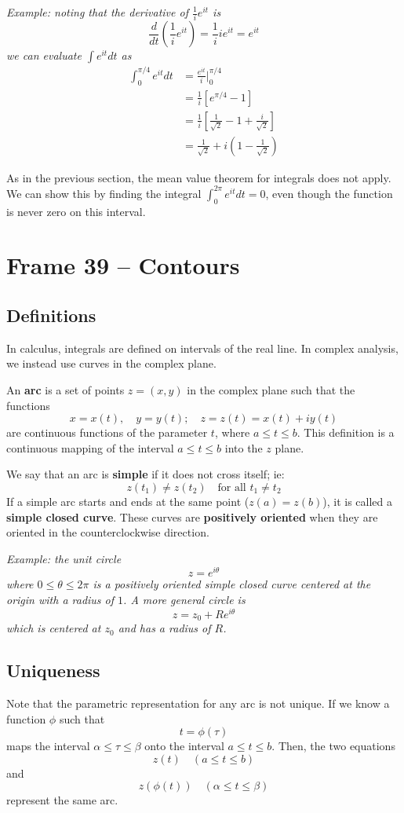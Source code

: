 \documentclass{article}
\renewcommand{\emph}{\textbf}
\begin{document}
\textit{Example: noting that the derivative of $\frac{1}{i} e^{it}$ is
\[
	\frac{d}{dt} \left( \frac{1}{i} e^{it} \right)
	= \frac{1}{i} ie^{it}
	= e^{it}
\]
we can evaluate $\int e^{it} dt$ as
\begin{align*}
	\int_0^{\pi/4} e^{it} dt 
	&= \frac{e^{it}}{i} \Big|_0^{\pi/4} \\
	&= \frac{1}{i} \left[ e^{\pi/4} - 1 \right] \\
	&= \frac{1}{i} \left[ \frac{1}{\sqrt{2}} - 1 + \frac{i}{\sqrt{2}} \right] \\
	&= \frac{1}{\sqrt{2}} + i\left( 1 - \frac{1}{\sqrt{2}} \right)
\end{align*}}

As in the previous section, the mean value theorem for integrals does not apply. We can show this by finding the integral $\int_0^{2\pi} e^{it} dt = 0$, even though the function is never zero on this interval.


\clearpage
\section{Frame 39 -- Contours}
\subsection{Definitions}
In calculus, integrals are defined on intervals of the real line. In complex analysis, we instead use curves in the complex plane.

An \emph{arc} is a set of points $z = (x, y)$ in the complex plane such that the functions
\[
	x = x(t),	\quad y = y(t);	\quad z = z(t) = x(t) + iy(t)
\]
are continuous functions of the parameter $t$, where $a \le t \le b$. This definition is a continuous mapping of the interval $a \le t \le b$ into the $z$ plane.

We say that an arc is \emph{simple} if it does not cross itself; ie:
\[
	z(t_1) \ne z(t_2)	\quad \text{for all } t_1 \neq t_2
\]
If a simple arc starts and ends at the same point ($z(a) = z(b)$), it is called a \emph{simple closed curve}. These curves are \emph{positively oriented} when they are oriented in the counterclockwise direction. 

\textit{Example: the unit circle
\[
	z = e^{i\theta}
\]
where $0 \le \theta \le 2\pi$ is a positively oriented simple closed curve centered at the origin with a radius of $1$. A more general circle is
\[
	z = z_0 + Re^{i\theta}
\]
which is centered at $z_0$ and has a radius of $R$.}

\subsection{Uniqueness}
Note that the parametric representation for any arc is not unique. If we know a function $\phi$ such that
\[
	t = \phi(\tau)
\]
maps the interval $\alpha \le \tau \le \beta$ onto the interval $a \le t \le b$. Then, the two equations
\[
	z(t) \quad (a \le t \le b)
\]
and
\[
	z(\phi(t)) \quad	(\alpha \le t \le \beta)
\]
represent the same arc.
\end{document}
